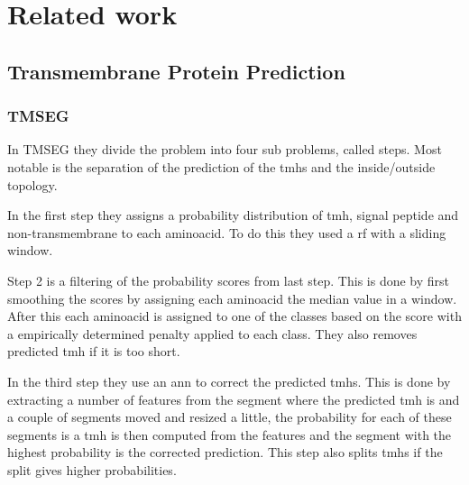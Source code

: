 \section{Related work}

\subsection{Transmembrane Protein Prediction}
% 



\subsubsection{TMSEG}
In TMSEG\cite{tmseg} they divide the problem into four sub problems, called steps. 
Most notable is the separation of the prediction of the \glspl{tmh} and the inside/outside topology. 

In the first step they assigns a probability distribution of \gls{tmh}, signal peptide and non-transmembrane 
to each aminoacid. To do this they used a \gls{rf} with a sliding window. 

Step 2 is a filtering of the probability scores from last step. This is done by first smoothing the scores 
by assigning each aminoacid the median value in a window. After this each aminoacid is assigned to 
one of the classes based on the score with a empirically determined penalty applied to each class.
They also removes predicted \gls{tmh} if it is too short.

In the third step they use an \gls{ann} to correct the predicted \glspl{tmh}. This is done by extracting a 
number of features from the segment where the predicted \gls{tmh} is and a couple of segments moved and 
resized a little, the probability for each of these segments is a \gls{tmh} is then computed from the features
and the segment with the highest probability is the corrected prediction. This step also splits 
\glspl{tmh} if the split gives higher probabilities. 

